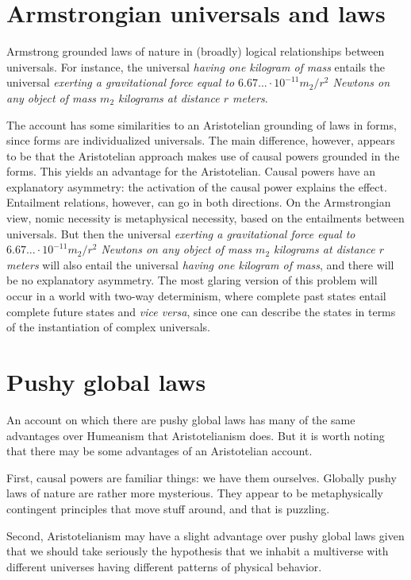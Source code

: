 \section{Armstrongian universals and laws}
Armstrong grounded laws of nature in (broadly) logical relationships between universals. For instance, the universal
\textit{having one kilogram of mass} entails the universal \textit{exerting a gravitational
force equal to $6.67... \cdot 10^{-11} m_2/r^2$ Newtons on any object of mass $m_2$ kilograms at 
distance $r$ meters}. 

The account has some similarities to an Aristotelian grounding of laws in 
forms, since forms are individualized universals. The main difference, however, appears to be that the Aristotelian
approach makes use of causal powers grounded in the forms. This yields an advantage for the Aristotelian.
Causal powers have an explanatory asymmetry: the activation of the causal power explains the effect. 
Entailment relations, however, can go in both directions. On the Armstrongian view, nomic necessity is 
metaphysical necessity, based on the entailments between universals. But then the universal \textit{exerting a gravitational
force equal to $6.67... \cdot 10^{-11} m_2/r^2$ Newtons on any object of mass $m_2$ kilograms at 
distance $r$ meters} will also entail the universal \textit{having one kilogram of mass}, and there will be no 
explanatory asymmetry. The most glaring version of this problem will occur in a world with two-way determinism, where 
complete past states entail complete future states and \textit{vice versa}, since one can describe the states in terms of 
the instantiation of complex universals. 

\section{Pushy global laws}
An account on which there are pushy global laws has many of the same advantages over Humeanism that Aristotelianism
does. But it is worth noting that there may be some advantages of an Aristotelian account.

First, causal powers are familiar things: we have them ourselves. Globally pushy laws of nature are rather more mysterious. 
They appear to be metaphysically contingent principles that move stuff around, and that is puzzling.

Second, Aristotelianism may have a slight advantage over pushy global laws given that we should take seriously
the hypothesis that we inhabit a multiverse with different universes having different patterns of physical behavior. 


